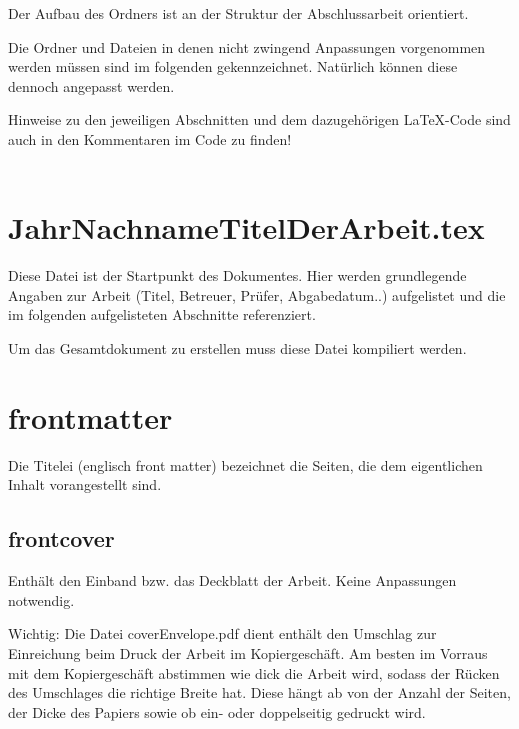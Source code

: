 Der Aufbau des Ordners ist an der Struktur der Abschlussarbeit orientiert. 

Die Ordner und Dateien in denen nicht zwingend Anpassungen vorgenommen werden müssen sind im folgenden gekennzeichnet. Natürlich können diese dennoch angepasst werden.

Hinweise zu den jeweiligen Abschnitten und dem dazugehörigen LaTeX-Code sind auch in den Kommentaren im Code zu finden!\\ 
\\


\section*{JahrNachnameTitelDerArbeit.tex}

Diese Datei ist der Startpunkt des Dokumentes. Hier werden grundlegende Angaben zur Arbeit (Titel, Betreuer, Prüfer, Abgabedatum..) aufgelistet und die im folgenden aufgelisteten Abschnitte referenziert. 

Um das Gesamtdokument zu erstellen muss diese Datei kompiliert werden.

\section*{frontmatter}

Die Titelei (englisch front matter) bezeichnet die Seiten, die dem eigentlichen Inhalt vorangestellt sind.

\subsection*{frontcover}
\label{section:_01_frontcover}

Enthält den Einband bzw. das Deckblatt der Arbeit. Keine Anpassungen notwendig.

Wichtig: Die Datei coverEnvelope.pdf dient enthält den Umschlag zur Einreichung beim Druck der Arbeit im Kopiergeschäft. Am besten im Vorraus mit dem Kopiergeschäft abstimmen wie dick die Arbeit wird, sodass der Rücken des Umschlages die richtige Breite hat. Diese hängt ab von der Anzahl der Seiten, der Dicke des Papiers sowie ob ein- oder doppelseitig gedruckt wird.

